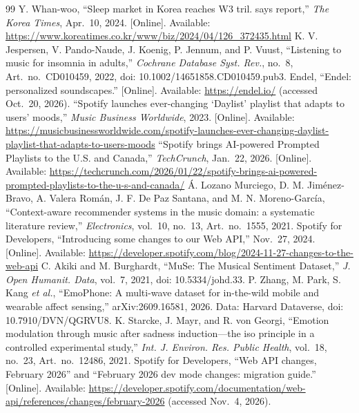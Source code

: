 \documentclass[conference]{IEEEtran}
\begin{document}
\enlargethispage{5\baselineskip}
\begin{thebibliography}{99}
\setlength{\itemsep}{0pt}
\footnotesize
{} Y. Whan-woo, ``Sleep market in Korea reaches W3 tril. says report,'' \textit{The Korea Times}, Apr.\ 10, 2024. [Online]. Available: \url{https://www.koreatimes.co.kr/www/biz/2024/04/126_372435.html}
 K. V. Jespersen, V. Pando-Naude, J. Koenig, P. Jennum, and P. Vuust, ``Listening to music for insomnia in adults,'' \textit{Cochrane Database Syst. Rev.}, no.~8, Art.\ no.\ CD010459, 2022, doi: 10.1002/14651858.CD010459.pub3.
 Endel, ``Endel: personalized soundscapes.'' [Online]. Available: \url{https://endel.io/} (accessed Oct.\ 20, 2026).
 ``Spotify launches ever-changing `Daylist' playlist that adapts to users' moods,'' \textit{Music Business Worldwide}, 2023. [Online]. Available: \url{https://musicbusinessworldwide.com/spotify-launches-ever-changing-daylist-playlist-that-adapts-to-users-moods}
 ``Spotify brings AI-powered Prompted Playlists to the U.S. and Canada,'' \textit{TechCrunch}, Jan.\ 22, 2026. [Online]. Available: \url{https://techcrunch.com/2026/01/22/spotify-brings-ai-powered-prompted-playlists-to-the-u-s-and-canada/}
 \'A. Lozano Murciego, D. M. Jim\'enez-Bravo, A. Valera Rom\'an, J. F. De Paz Santana, and M. N. Moreno-Garc\'ia, ``Context-aware recommender systems in the music domain: a systematic literature review,'' \textit{Electronics}, vol.~10, no.~13, Art.\ no.\ 1555, 2021.
 Spotify for Developers, ``Introducing some changes to our Web API,'' Nov.\ 27, 2024. [Online]. Available: \url{https://developer.spotify.com/blog/2024-11-27-changes-to-the-web-api}
 C. Akiki and M. Burghardt, ``MuSe: The Musical Sentiment Dataset,'' \textit{J. Open Humanit. Data}, vol.~7, 2021, doi: 10.5334/johd.33.
 P. Zhang, M. Park, S. Kang \textit{et al.}, ``EmoPhone: A multi-wave dataset for in-the-wild mobile and wearable affect sensing,'' arXiv:2609.16581, 2026. Data: Harvard Dataverse, doi: 10.7910/DVN/QGRVU8.
 K. Starcke, J. Mayr, and R. von Georgi, ``Emotion modulation through music after sadness induction---the iso principle in a controlled experimental study,'' \textit{Int. J. Environ. Res. Public Health}, vol.~18, no.~23, Art.\ no.\ 12486, 2021.
 Spotify for Developers, ``Web API changes, February 2026'' and ``February 2026 dev mode changes: migration guide.'' [Online]. Available: \url{https://developer.spotify.com/documentation/web-api/references/changes/february-2026} (accessed Nov.\ 4, 2026).

\end{thebibliography}
\end{document}
